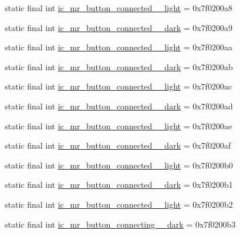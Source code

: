 \begin{CompactItemize}
static final int \hyperlink{classandroid_1_1support_1_1v7_1_1mediarouter_1_1_r_1_1drawable_b6508cb969c381af84150a5609766f3b}{ic\_\-mr\_\-button\_\-connected\_\_\-light} = 0x7f0200a8
\item 
static final int \hyperlink{classandroid_1_1support_1_1v7_1_1mediarouter_1_1_r_1_1drawable_f7d299cc0a368458f21b790642b4d09c}{ic\_\-mr\_\-button\_\-connected\_\_\-dark} = 0x7f0200a9
\item 
static final int \hyperlink{classandroid_1_1support_1_1v7_1_1mediarouter_1_1_r_1_1drawable_0e8211bb06810ae0077ad60ddb12d072}{ic\_\-mr\_\-button\_\-connected\_\_\-light} = 0x7f0200aa
\item 
static final int \hyperlink{classandroid_1_1support_1_1v7_1_1mediarouter_1_1_r_1_1drawable_0d34e889095e830878dc41f52fc1bad2}{ic\_\-mr\_\-button\_\-connected\_\_\-dark} = 0x7f0200ab
\item 
static final int \hyperlink{classandroid_1_1support_1_1v7_1_1mediarouter_1_1_r_1_1drawable_aede6affdbcb9abcf3011390cd25186b}{ic\_\-mr\_\-button\_\-connected\_\_\-light} = 0x7f0200ac
\item 
static final int \hyperlink{classandroid_1_1support_1_1v7_1_1mediarouter_1_1_r_1_1drawable_f7e0bd5de71044609196b70a25a8269a}{ic\_\-mr\_\-button\_\-connected\_\_\-dark} = 0x7f0200ad
\item 
static final int \hyperlink{classandroid_1_1support_1_1v7_1_1mediarouter_1_1_r_1_1drawable_6e9df70672d97446060002c547f0d26c}{ic\_\-mr\_\-button\_\-connected\_\_\-light} = 0x7f0200ae
\item 
static final int \hyperlink{classandroid_1_1support_1_1v7_1_1mediarouter_1_1_r_1_1drawable_229aafa27cc91c567c4a53900d3933af}{ic\_\-mr\_\-button\_\-connected\_\_\-dark} = 0x7f0200af
\item 
static final int \hyperlink{classandroid_1_1support_1_1v7_1_1mediarouter_1_1_r_1_1drawable_0e517440780300000f67577aeaaf80ea}{ic\_\-mr\_\-button\_\-connected\_\_\-light} = 0x7f0200b0
\item 
static final int \hyperlink{classandroid_1_1support_1_1v7_1_1mediarouter_1_1_r_1_1drawable_50d3892ce398fb875246816b2f44b39d}{ic\_\-mr\_\-button\_\-connected\_\_\-dark} = 0x7f0200b1
\item 
static final int \hyperlink{classandroid_1_1support_1_1v7_1_1mediarouter_1_1_r_1_1drawable_b40eebc10b1444f46c3c5b265d0f2156}{ic\_\-mr\_\-button\_\-connected\_\_\-light} = 0x7f0200b2
\item 
static final int \hyperlink{classandroid_1_1support_1_1v7_1_1mediarouter_1_1_r_1_1drawable_ddde158f985a9214fb5943a70b267fc0}{ic\_\-mr\_\-button\_\-connecting\_\_\-dark} = 0x7f0200b3

\end{CompactItemize}
